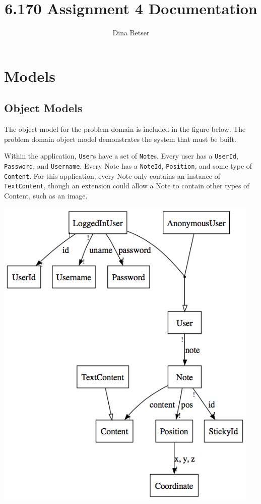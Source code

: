 \documentclass[11pt,letterpaper]{article}
\title{6.170 Assignment 4 Documentation}
\author{Dina Betser}
\begin{document}
\maketitle

\section{Models}
\subsection{Object Models}
The object model for the problem domain is included in the figure below. The problem domain object model demonstrates the system that must be built. 

Within the application, \texttt{User}s have a set of \texttt{Note}s. Every user has a \texttt{UserId}, \texttt{Password}, and \texttt{Username}.  Every Note has a \texttt{NoteId}, \texttt{Position}, and some type of \texttt{Content}. For this application, every Note only contains an instance of \texttt{TextContent}, though an extension could allow a Note to contain other types of Content, such as an image.
\begin{center}
\includegraphics[width=5in]{dot/obmod.png}
\label{fig:ob1} 
\end{center}
\end{document}
